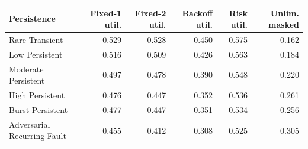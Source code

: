 \begin{tabular}{lrrrrr}
\toprule
Persistence & Fixed-1 util. & Fixed-2 util. & Backoff util. & Risk util. & Unlim. masked \\
\midrule
Rare Transient & 0.529 & 0.528 & 0.450 & 0.575 & 0.162 \\
Low Persistent & 0.516 & 0.509 & 0.426 & 0.563 & 0.184 \\
Moderate Persistent & 0.497 & 0.478 & 0.390 & 0.548 & 0.220 \\
High Persistent & 0.476 & 0.447 & 0.352 & 0.536 & 0.261 \\
Burst Persistent & 0.477 & 0.447 & 0.351 & 0.534 & 0.256 \\
Adversarial Recurring Fault & 0.455 & 0.412 & 0.308 & 0.525 & 0.305 \\
\bottomrule
\end{tabular}
